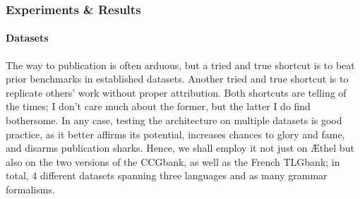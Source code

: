 \subsubsection{Experiments \& Results}
\paragraph{Datasets}
The way to publication is often arduous, but a tried and true shortcut is to beat prior benchmarks in established datasets.
Another tried and true shortcut is to replicate others' work without proper attribution.
Both shortcuts are telling of the times; I don't care much about the former, but the latter I do find bothersome.
In any case, testing the architecture on multiple datasets is good practice, as it better affirms its potential, increases chances to glory and fame, and disarms publication sharks.
Hence, we shall employ it not just on \AE thel but also on the two versions of the CCGbank, as well as the French TLGbank; in total, 4 different datasets spanning three languages and as many grammar formalisms.

